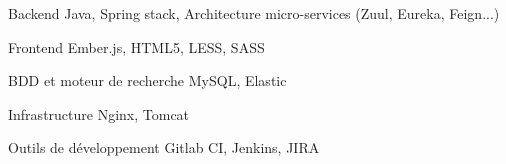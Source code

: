 

\begin{cvskills}

  \cvskill
    {Backend} %
    {Java, Spring stack, Architecture micro-services (Zuul, Eureka, Feign...)} %

  \cvskill
    {Frontend} %
    {Ember.js, HTML5, LESS, SASS} %

  \cvskill
    {BDD et moteur de recherche} %
    {MySQL, Elastic} %

  \cvskill
    {Infrastructure} %
    {Nginx, Tomcat} %

  \cvskill
    {Outils de développement}
    {Gitlab CI, Jenkins, JIRA}
\end{cvskills}
